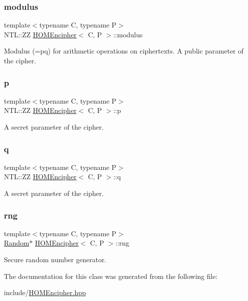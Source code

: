 \subsubsection{\texorpdfstring{modulus}{modulus}}
{\footnotesize\ttfamily template$<$typename C, typename P$>$ \\
N\+T\+L\+::\+ZZ \hyperlink{classHOMEncipher}{H\+O\+M\+Encipher}$<$ C, P $>$\+::modulus\hspace{0.3cm}{\ttfamily [protected]}}

Modulus (=pq) for arithmetic operations on ciphertexts. A public parameter of the cipher. \mbox{\label{classHOMEncipher_a57eb1b665612ec7caaa601af9b809866}} 
\subsubsection{\texorpdfstring{p}{p}}
{\footnotesize\ttfamily template$<$typename C, typename P$>$ \\
N\+T\+L\+::\+ZZ \hyperlink{classHOMEncipher}{H\+O\+M\+Encipher}$<$ C, P $>$\+::p\hspace{0.3cm}{\ttfamily [protected]}}

A secret parameter of the cipher. \mbox{\label{classHOMEncipher_ab9e6d7d4d4574c74a08169441e3213b2}} 
\subsubsection{\texorpdfstring{q}{q}}
{\footnotesize\ttfamily template$<$typename C, typename P$>$ \\
N\+T\+L\+::\+ZZ \hyperlink{classHOMEncipher}{H\+O\+M\+Encipher}$<$ C, P $>$\+::q\hspace{0.3cm}{\ttfamily [protected]}}

A secret parameter of the cipher. \mbox{\label{classHOMEncipher_a93a3cf6c4d8c7105380a2b13a08db774}} 
\subsubsection{\texorpdfstring{rng}{rng}}
{\footnotesize\ttfamily template$<$typename C, typename P$>$ \\
\hyperlink{classRandom}{Random}$\ast$ \hyperlink{classHOMEncipher}{H\+O\+M\+Encipher}$<$ C, P $>$\+::rng\hspace{0.3cm}{\ttfamily [protected]}}

Secure random number generator. 

The documentation for this class was generated from the following file\+:\begin{DoxyCompactItemize}
\item 
include/\hyperlink{HOMEncipher_8hpp}{H\+O\+M\+Encipher.\+hpp}\end{DoxyCompactItemize}
